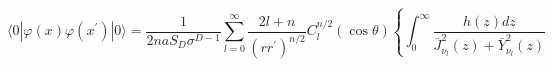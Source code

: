 \begin{equation}
\langle 0|\varphi (x)\varphi (x^{\prime })|0\rangle
=\frac{1}{2naS_{D}\sigma ^{D-1}}\sum_{l=0}^{\infty
}\frac{2l+n}{(rr^{\prime })^{n/2}}C_{l}^{n/2}(\cos
\theta )\left\{ \int_{0}^{\infty }\frac{h(z)dz}{\bar{J}_{\nu _{l} }^{2}(z)+\bar{Y}%
_{\nu _{l} }^{2}(z)}\right.   \label{unregWightab}
\end{equation}

